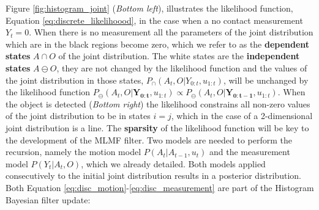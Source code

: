 \documentclass{frontiersSCNS} %
\newcommand{\ThA}{\boldsymbol{\theta}_a}
\newcommand{\ThO}{\boldsymbol{\theta}_o}
\begin{document}
Figure \ref{fig:histogram_joint} (\textit{Bottom left}), illustrates the likelihood function, Equation \ref{eq:discrete_likelihoood}, 
in the case when a no contact measurement $Y_t=0$. When there is no measurement all the parameters of the 
joint distribution which are in the black regions become zero, which we refer to as the \textbf{dependent states} $A \cap O$ of the joint 
distribution. The white states are the \textbf{independent states} $A \ominus O$, they are not changed by the likelihood function 
and the values of the joint distribution in those states, $P_{\cap}(A_t,O|Y_{0:t},u_{1:t})$, will be unchanged by the likelihood function
$P_{\ominus}(A_t,O|\mathbf{Y_{0:t}},u_{1:t}) \propto P_{\ominus}(A_t,O|\mathbf{Y_{0:t-1}},u_{1:t})$. 
When the object is detected (\textit{Bottom right}) the likelihood constrains all non-zero values of the joint 
distribution to be in states $i = j$, which in the case of a 2-dimensional joint 
distribution is a line. The \textbf{sparsity} of the likelihood function  will be key to the development of the MLMF filter.
Two models are needed to perform the recursion, namely the motion model $P(A_t|A_{t-1},u_t)$ and the measurement model
$P(Y_t|A_t,O)$, which we already detailed. Both models applied consecutively to the initial joint distribution results in a posterior
distribution. Both Equation \ref{eq:disc_motion}-\ref{eq:disc_measurement} are part of the Histogram Bayesian filter 
update:
\begin{center}
%
\end{center}
\end{document}
